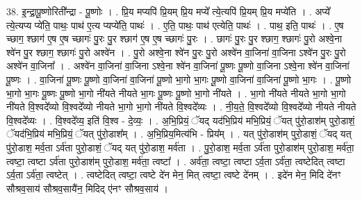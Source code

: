 \documentclass[17pt]{extarticle}
\begin{document}
38. इ॒न्द्रा॒पू॒ष्णोरिती᳚न्द्रा - पू॒ष्णोः । . प्रि॒य मप्यपि॑ प्रि॒यम् प्रि॒य मप्ये᳚ त्ये॒त्यपि॑ प्रि॒यम् प्रि॒य मप्ये॑ति । . अप्ये᳚ त्ये॒त्यप्य प्ये॑ति॒ पाथः॒ पाथ॑ ए॒त्य प्यप्ये॑ति॒ पाथः॑ । . ए॒ति॒ पाथः॒ पाथ॑ एत्येति॒ पाथः॑ । . पाथ॒ इति॒ पाथः॑ । . ए॒ष च्छाग॒ श्छाग॑ ए॒ष ए॒ष च्छागः॑ पु॒रः पु॒र श्छाग॑ ए॒ष ए॒ष च्छागः॑ पु॒रः । . छागः॑ पु॒रः पु॒र श्छाग॒ श्छागः॑ पु॒रो अश्वे॒ना श्वे॑न पु॒र श्छाग॒ श्छागः॑ पु॒रो अश्वे॑न । . पु॒रो अश्वे॒ना श्वे॑न पु॒रः पु॒रो अश्वे॑न वा॒जिना॑ वा॒जिना ऽश्वे॑न पु॒रः पु॒रो अश्वे॑न वा॒जिना᳚ । . अश्वे॑न वा॒जिना॑ वा॒जिना ऽश्वे॒ना श्वे॑न वा॒जिना॑ पू॒ष्णः पू॒ष्णो वा॒जिना ऽश्वे॒ना श्वे॑न वा॒जिना॑ पू॒ष्णः । . वा॒जिना॑ पू॒ष्णः पू॒ष्णो वा॒जिना॑ वा॒जिना॑ पू॒ष्णो भा॒गो भा॒गः पू॒ष्णो वा॒जिना॑ वा॒जिना॑ पू॒ष्णो भा॒गः । . पू॒ष्णो भा॒गो भा॒गः पू॒ष्णः पू॒ष्णो भा॒गो नी॑यते नीयते भा॒गः पू॒ष्णः पू॒ष्णो भा॒गो नी॑यते । . भा॒गो नी॑यते नीयते भा॒गो भा॒गो नी॑यते वि॒श्वदे᳚व्यो वि॒श्वदे᳚व्यो नीयते भा॒गो भा॒गो नी॑यते वि॒श्वदे᳚व्यः । . नी॒य॒ते॒ वि॒श्वदे᳚व्यो वि॒श्वदे᳚व्यो नीयते नीयते वि॒श्वदे᳚व्यः । . वि॒श्वदे᳚व्य॒ इति॑ वि॒श्व - दे॒व्यः॒ । . अ॒भि॒प्रियं॒ ॅयद् यद॑भि॒प्रिय॑ मभि॒प्रियं॒ ॅयत् पु॑रो॒डाश॑म् पुरो॒डाशं॒ ॅयद॑भि॒प्रिय॑ मभि॒प्रियं॒ ॅयत् पु॑रो॒डाश᳚म् । . अ॒भि॒प्रिय॒मित्य॑भि - प्रिय᳚म् । . यत् पु॑रो॒डाश॑म् पुरो॒डाशं॒ ॅयद् यत् पु॑रो॒डाश॒ मर्व॒ता ऽर्व॑ता पुरो॒डाशं॒ ॅयद् यत् पु॑रो॒डाश॒ मर्व॑ता । . पु॒रो॒डाश॒ मर्व॒ता ऽर्व॑ता पुरो॒डाश॑म् पुरो॒डाश॒ मर्व॑ता॒ त्वष्टा॒ त्वष्टा ऽर्व॑ता पुरो॒डाश॑म् पुरो॒डाश॒ मर्व॑ता॒ त्वष्टा᳚ । . अर्व॑ता॒ त्वष्टा॒ त्वष्टा ऽर्व॒ता ऽर्व॑ता॒ त्वष्टेदित् त्वष्टा ऽर्व॒ता ऽर्व॑ता॒ त्वष्टेत् । . त्वष्टेदित् त्वष्टा॒ त्वष्टे दे॑न मेन॒ मित् त्वष्टा॒ त्वष्टे दे॑नम् । . इदे॑न मेन॒ मिदि दे॑नꣳ सौश्रव॒साय॑ सौश्रव॒सायै॑न॒ मिदिद् ए॑नꣳ सौश्रव॒साय॑ । \newline
\pagebreak
{}
\end{document}
